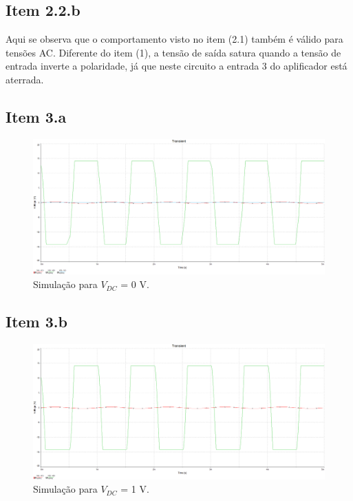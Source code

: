 \documentclass[11pt]{article}
\begin{document}
\subsection*{Item 2.2.b}

Aqui se observa que o comportamento visto no item (2.1) também é válido para tensões AC. Diferente do item (1), a tensão de saída satura quando a tensão de entrada inverte a polaridade, já que neste circuito a entrada 3 do aplificador está aterrada.

\pagebreak

\subsection*{Item 3.a}

\begin{figure}[h!]
  \centering
  \includegraphics[width=\textwidth]{fig/sim3a}
  \caption{Simulação para $V_{DC}$ = 0 V.}
\end{figure}

\subsection*{Item 3.b}

\begin{figure}[h!]
  \centering
  \includegraphics[width=\textwidth]{fig/sim2_b}
  \caption{Simulação para $V_{DC}$ = 1 V.}
\end{figure}
\end{document}
